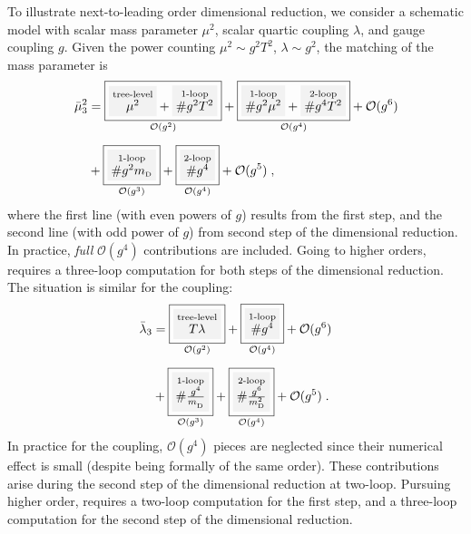 \documentclass[11pt]{article}
\newcommand{\mD}{m_\rmii{D}}
\renewcommand{\nn}{\nonumber \\}
\newcommand{\rmii}[1]{{\mbox{\tiny\rm{#1}}}}
\begin{document}
To illustrate next-to-leading order dimensional reduction,
we consider a schematic model with
scalar mass parameter $\mu^2$,
scalar quartic coupling $\lambda$, and
gauge coupling $g$. 
Given the power counting
$\mu^2 \sim g^2 T^2$,
$\lambda \sim g^2$,
the matching of the mass parameter is
\begin{align}
%
\bar{\mu}^2_3 &=
  \underset{\mathcal{O}(g^2)}{
    \fbox{$
      \colorbox{gray!10}{$
        \overset{\text{tree-level}}{\mu^2}
        $}
    + \colorbox{gray!10}{$
      \overset{\text{1-loop}}{\# g^2 T^2}
      $}
    $}
  }
  + \underset{\mathcal{O}(g^4)}{
    \fbox{$
      \colorbox{gray!10}{$
      \overset{\text{1-loop}}{\# g^2\mu^2}
        $}
    + \colorbox{gray!10}{$
      \overset{\text{2-loop}}{\# g^4 T^2}
      $}
    $}
    }
  + \mathcal{O}(g^6)
  \nn[2mm] &
  + \underset{\mathcal{O}(g^3)}{
    \fbox{$
    \colorbox{gray!10}{$
    \overset{\text{1-loop}}{\# g^2\mD}
    $}
    $}
  }
  + \underset{\mathcal{O}(g^4)}{
    \fbox{$\colorbox{gray!10}{$
    \overset{\text{2-loop}}{\# g^4}
    $}$}
  }
  + \mathcal{O}(g^5)
  \;,
\end{align}
where
the first line (with even powers of $g$) results from the first step, and
the second line (with odd power of $g$) from second step of the dimensional reduction.
In practice, {\em full} $\mathcal{O}(g^4)$ contributions are included.
Going to higher orders, requires
a three-loop computation for both steps of the dimensional reduction. 
The situation is similar for the coupling:
\begin{align}
\bar{\lambda}_3 &=
    \underset{\mathcal{O}(g^2)}{
    \fbox{$\colorbox{gray!10}{$
      \overset{\text{tree-level}}{T \lambda \vphantom{g^4}}
    $}$}
    }
  + \underset{\mathcal{O}(g^4)}{
    \fbox{$\colorbox{gray!10}{$
    \overset{\text{1-loop}}{\# g^{4}}
    $}$}
  }
  + \mathcal{O}(g^6)
  \nn[2mm] &
  + \underset{\mathcal{O}(g^3)}{
    \fbox{$\colorbox{gray!10}{$
    \overset{\text{1-loop}}{\# \frac{g^4}{\mD^{ }}}
    $}$}
  }
  + \underset{\mathcal{O}(g^4)}{
    \fbox{$\colorbox{gray!10}{$
    \overset{\text{2-loop}}{\# \frac{g^6}{\mD^{2}}}
    $}$}
  }
  + \mathcal{O}(g^5)
  \;. 
\end{align}
In practice for the coupling, $\mathcal{O}(g^4)$ pieces are neglected since
their numerical effect is small (despite being formally of the same order).
These contributions arise during the second step of
the dimensional reduction at two-loop.
Pursuing higher order, requires
a two-loop computation for the first step, and
a three-loop computation for the second step of the dimensional reduction. 
\end{document}
